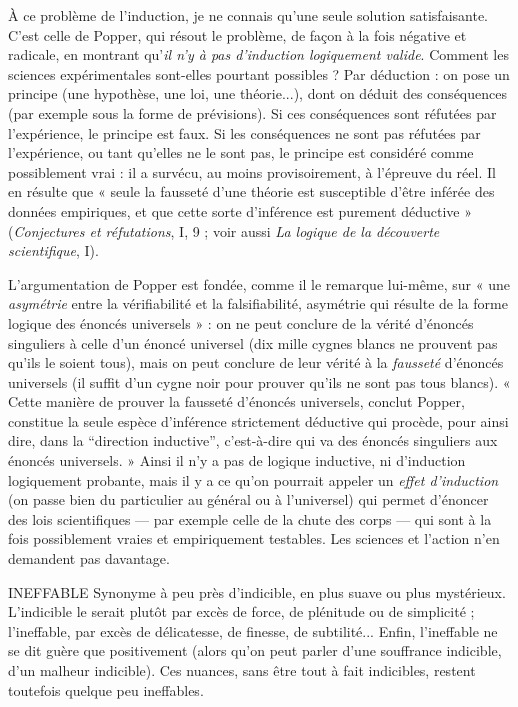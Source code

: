 À ce problème de l'induction, je ne connais qu’une seule solution satisfaisante.
C’est celle de Popper, qui résout le problème, de façon à la fois négative
et radicale, en montrant qu’{\it il n'y à pas d'induction logiquement valide}. Comment
les sciences expérimentales sont-elles pourtant possibles ? Par déduction :
on pose un principe (une hypothèse, une loi, une théorie...), dont on déduit
des conséquences (par exemple sous la forme de prévisions). Si ces conséquences
sont réfutées par l’expérience, le principe est faux. Si les conséquences
ne sont pas réfutées par l'expérience, ou tant qu’elles ne le sont pas, le principe
est considéré comme possiblement vrai : il a survécu, au moins provisoirement,
à l'épreuve du réel. Il en résulte que « seule la fausseté d’une théorie est susceptible
d’être inférée des données empiriques, et que cette sorte d’inférence est
purement déductive » ({\it Conjectures et réfutations}, I, 9 ; voir aussi {\it La logique de la
découverte scientifique}, I).

L’argumentation de Popper est fondée, comme il le remarque lui-même,
sur « une {\it asymétrie} entre la vérifiabilité et la falsifiabilité, asymétrie qui résulte
de la forme logique des énoncés universels » : on ne peut conclure de la vérité
d’énoncés singuliers à celle d’un énoncé universel (dix mille cygnes blancs ne
prouvent pas qu’ils le soient tous), mais on peut conclure de leur vérité à la
{\it fausseté} d’énoncés universels (il suffit d’un cygne noir pour prouver qu’ils ne
sont pas tous blancs). « Cette manière de prouver la fausseté d’énoncés universels,
conclut Popper, constitue la seule espèce d’inférence strictement
déductive qui procède, pour ainsi dire, dans la “direction inductive”, c’est-à-dire
qui va des énoncés singuliers aux énoncés universels. » Ainsi il n’y a pas
de logique inductive, ni d’induction logiquement probante, mais il y a ce
qu’on pourrait appeler un {\it effet d'induction} (on passe bien du particulier au
général ou à l’universel) qui permet d’énoncer des lois scientifiques — par
exemple celle de la chute des corps — qui sont à la fois possiblement vraies et
empiriquement testables. Les sciences et l’action n’en demandent pas davantage.

INEFFABLE Synonyme à peu près d’indicible, en plus suave ou plus mystérieux.
L’indicible le serait plutôt par excès de force, de plénitude
ou de simplicité ; l’ineffable, par excès de délicatesse, de finesse, de subtilité...
Enfin, l’ineffable ne se dit guère que positivement (alors qu'on peut
parler d’une souffrance indicible, d’un malheur indicible). Ces nuances, sans
être tout à fait indicibles, restent toutefois quelque peu ineffables.

